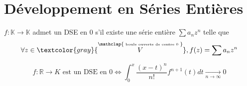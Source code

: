 \documentclass[11pt,a4paper,fleqn,pdftex]{report}
\begin{document}
\section{Développement en Séries Entières}
\begin{dfn}
$f:\mathbb{K}\to\mathbb{K}$ admet un DSE en $0$ s'il existe une série entière $\sum a_n z^n$ telle que \[
\forall z \in \textcolor{gray}{\overset{\mathclap{\text{\begin{tiny}
boule ouverte de centre 0
\end{tiny}}}}{V}}, f(z) = \sum a_n z^{n}
\]
\end{dfn}
\begin{theorem}

\[
f:\mathbb{R}\rightarrow K\text{ est un DSE en 0}\Leftrightarrow \boxed{\displaystyle \int_0^x \dfrac{(x-t)^n}{n!}f^{n+1}(t) dt \underset{n\to\infty}{\to}0}
\]

\end{theorem}
\needspace{19cm}
\end{document}
